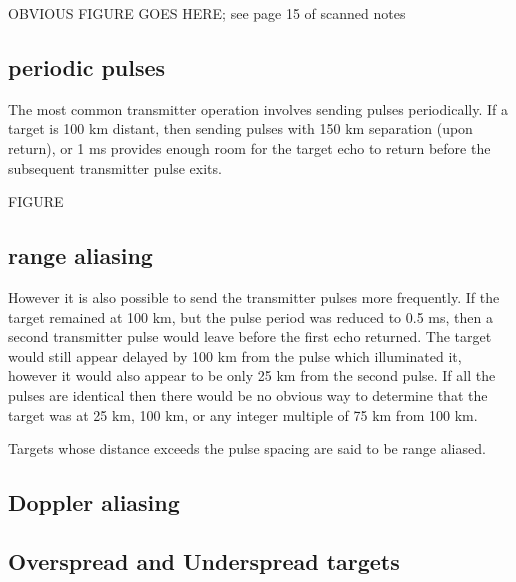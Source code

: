 \centerline{OBVIOUS FIGURE GOES HERE; see page 15 of scanned notes}

\subsection{periodic pulses}

The most common transmitter operation involves sending pulses
periodically.  If a target is 100 km distant, then sending pulses with
150 km separation (upon return), or 1 ms provides enough room for the
target echo to return before the subsequent transmitter pulse exits.

\centerline{FIGURE}

\subsection{range aliasing}

However it is also possible to send the transmitter pulses more
frequently.  If the target remained at 100 km, but the pulse period
was reduced to 0.5 ms, then a second transmitter pulse would leave
before the first echo returned.  The target would still appear delayed
by 100 km from the pulse which illuminated it, however it would also
appear to be only 25 km from the second pulse.  If all the pulses are
identical then there would be no obvious way to determine that the
target was at 25 km, 100 km, or any integer multiple of 75 km from 100
km.  

Targets whose distance exceeds the pulse spacing are said to be range
aliased. 

\subsection{Doppler aliasing}

\subsection{Overspread and Underspread targets}

